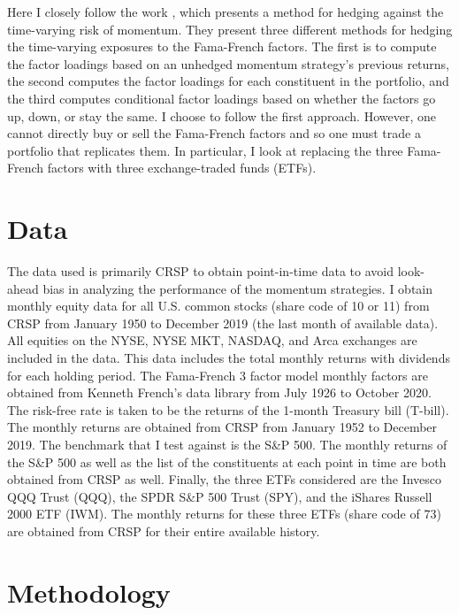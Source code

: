 \documentclass[10pt, letterpaper]{article}
\begin{document}
Here I closely follow the work \cite{MvO}, which presents a method for hedging against the time-varying risk of momentum.  They present three different methods for hedging the time-varying exposures to the Fama-French factors.  The first is to compute the factor loadings based on an unhedged momentum strategy's previous returns, the second computes the factor loadings for each constituent in the portfolio, and the third computes conditional factor loadings based on whether the factors go up, down, or stay the same.  I choose to follow the first approach.  However, one cannot directly buy or sell the Fama-French factors and so one must trade a portfolio that replicates them.  In particular, I look at replacing the three Fama-French factors with three exchange-traded funds (ETFs).





\section{Data}

The data used is primarily CRSP to obtain point-in-time data to avoid look-ahead bias in analyzing the performance of the momentum strategies.  I obtain monthly equity data for all U.S. common stocks (share code of 10 or 11) from CRSP from January 1950 to December 2019 (the last month of available data).  All equities on the NYSE, NYSE MKT, NASDAQ, and Arca exchanges are included in the data.  This data includes the total monthly returns with dividends for each holding period.  The Fama-French 3 factor model monthly factors are obtained from Kenneth French's data library \cite{FFDataSite} from July 1926 to October 2020.  The risk-free rate is taken to be the returns of the 1-month Treasury bill (T-bill).  The monthly returns are obtained from CRSP from January 1952 to December 2019.  The benchmark that I test against is the S\&P 500.  The monthly returns of the S\&P 500 as well as the list of the constituents at each point in time are both obtained from CRSP as well.  Finally, the three ETFs considered are the Invesco QQQ Trust (QQQ), the SPDR S\&P 500 Trust (SPY), and the iShares Russell 2000 ETF (IWM).  The monthly returns for these three ETFs (share code of 73) are obtained from CRSP for their entire available history.





\section{Methodology}
\end{document}
